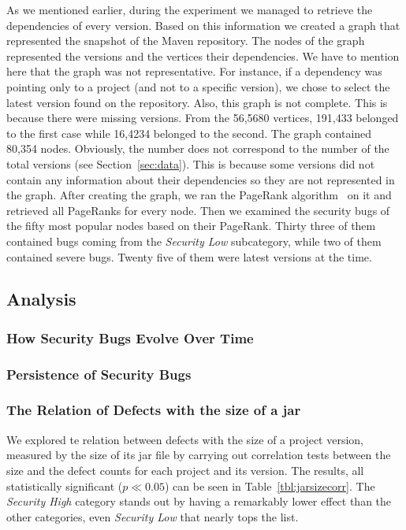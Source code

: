 \documentclass[conference]{llncs}
\begin{document}
As we mentioned earlier, during the experiment we managed to retrieve the
dependencies of every version. Based on this information we created a graph
that represented the snapshot of the Maven repository. The
nodes of the graph represented the versions and the vertices their dependencies.
We have to mention here that the graph was not representative. For instance, if
a dependency was pointing only to a project (and not to a specific version), we chose to
select the latest version found on the repository. Also, this graph is not
complete. This is because there were missing versions.
From the 56,5680 vertices, 191,433
belonged to the first case while 16,4234 belonged to the second.
The graph contained 80,354 nodes. Obviously, the number does not correspond to
the number of the total versions (see Section~\ref{sec:data}). This is because
some versions did not contain any information about their dependencies so they
are not represented in the graph. After creating the graph, we ran the PageRank
algorithm~\cite{BP98} on it and retrieved all PageRanks for every node. Then we
examined the security bugs of the fifty most popular nodes based on their PageRank.
Thirty three of them contained bugs coming from the {\it Security Low} subcategory,
while two of them contained severe bugs. Twenty five of them were latest
versions at the time.

\subsection{Analysis}
\label{sec:analysis}

\subsubsection{How Security Bugs Evolve Over Time}

\subsubsection{Persistence of Security Bugs}

\subsubsection{The Relation of Defects with the size of a {\sc jar}}

We explored te relation between defects with the size of a project version,
measured by the size of its {\sc jar} file by carrying out correlation tests
between the size and the defect counts for each project and its
version. The results, all statistically significant ($p \ll
0.05$) can be seen in Table~\ref{tbl:jarsizecorr}. The {\it Security
  High} category stands out by having a remarkably lower effect than
the other categories, even {\it Security Low} that nearly tops the
list. 
\end{document}
